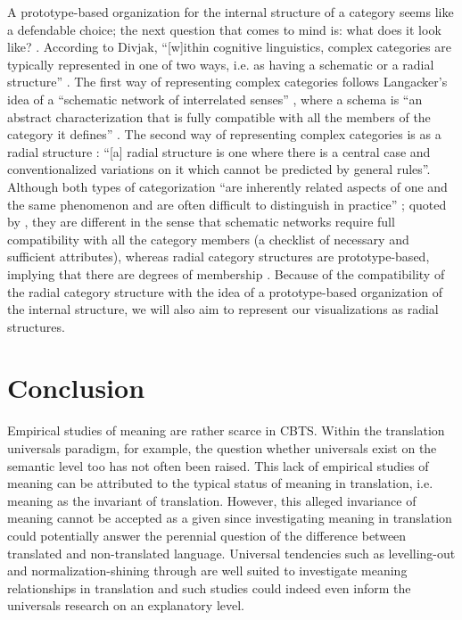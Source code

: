 A prototype-based organization for the internal structure of a category seems like a defendable choice; the next question that comes to mind is: what does it look like? \citep[149]{divjak_structuring_2010}. According to Divjak, “[w]ithin cognitive linguistics, complex categories are typically represented in one of two ways, i.e. as having a schematic or a radial structure” \citep[149]{divjak_structuring_2010}. The first way of representing complex categories follows Langacker’s idea of a “schematic network of interrelated senses” \citep[369,  371]{langacker_foundations_1987}, where a schema is “an abstract characterization that is fully compatible with all the members of the category it defines” \citep[149]{divjak_structuring_2010}. The second way of representing complex categories is as a radial structure \citep[84]{lakoff_women_1987}: “[a] radial structure is one where there is a central case and conventionalized variations on it which cannot be predicted by general rules”. Although both types of categorization “are inherently related aspects of one and the same phenomenon and are often difficult to distinguish in practice” \citep[371 ff.]{langacker_foundations_1987}; quoted by \citep[149]{divjak_structuring_2010}, they are different in the sense that schematic networks require full compatibility with all the category members (a checklist of necessary and sufficient attributes), whereas radial category structures are prototype-based, implying that there are degrees of membership \citep[150]{divjak_structuring_2010}. Because of the compatibility of the radial category structure with the idea of a prototype-based organization of the internal structure, we will also aim to represent our visualizations as radial structures.

\section{Conclusion}
\label{sec:2.5}  
Empirical studies of meaning are rather scarce in CBTS. Within the translation universals paradigm, for example, the question whether universals exist on the semantic level too has not often been raised. This lack of empirical studies of meaning can be attributed to the typical status of meaning in translation, i.e. meaning as the invariant of translation. However, this alleged invariance of meaning cannot be accepted as a given since investigating meaning in translation could potentially answer the perennial question of the difference between translated and non-translated language. Universal tendencies such as levelling-out and normalization-shining through are well suited to investigate meaning relationships in translation and such studies could indeed even inform the universals research on an explanatory level.

